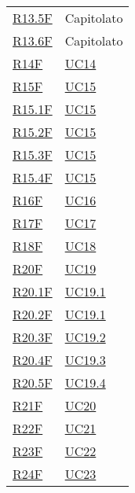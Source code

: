 \begin{center}
\begin{longtable}[!h]{p{50px} p{50px}}
        \hyperref[tab:RequisitiFunzionali]{R13.5F}   & Capitolato                    \\
        \hyperref[tab:RequisitiFunzionali]{R13.6F}   & Capitolato                    \\
        \hyperref[tab:RequisitiFunzionali]{R14F}     & \hyperref[sec:UC14]{UC14}     \\
        \hyperref[tab:RequisitiFunzionali]{R15F}     & \hyperref[sec:UC15]{UC15}     \\
        \hyperref[tab:RequisitiFunzionali]{R15.1F}   & \hyperref[sec:UC15]{UC15}     \\
        \hyperref[tab:RequisitiFunzionali]{R15.2F}   & \hyperref[sec:UC15]{UC15}     \\
        \hyperref[tab:RequisitiFunzionali]{R15.3F}   & \hyperref[sec:UC15]{UC15}     \\
        \hyperref[tab:RequisitiFunzionali]{R15.4F}   & \hyperref[sec:UC15]{UC15}     \\
        \hyperref[tab:RequisitiFunzionali]{R16F}     & \hyperref[sec:UC16]{UC16}     \\
        \hyperref[tab:RequisitiFunzionali]{R17F}     & \hyperref[sec:UC17]{UC17}     \\
        \hyperref[tab:RequisitiFunzionali]{R18F}     & \hyperref[sec:UC18]{UC18}     \\
        \hyperref[tab:RequisitiFunzionali]{R20F}     & \hyperref[sec:UC19]{UC19}     \\
        \hyperref[tab:RequisitiFunzionali]{R20.1F}   & \hyperref[sec:UC19.1]{UC19.1} \\
        \hyperref[tab:RequisitiFunzionali]{R20.2F}   & \hyperref[sec:UC19.1]{UC19.1} \\
        \hyperref[tab:RequisitiFunzionali]{R20.3F}   & \hyperref[sec:UC19.2]{UC19.2} \\
        \hyperref[tab:RequisitiFunzionali]{R20.4F}   & \hyperref[sec:UC19.3]{UC19.3} \\
        \hyperref[tab:RequisitiFunzionali]{R20.5F}   & \hyperref[sec:UC19.4]{UC19.4} \\
        \hyperref[tab:RequisitiFunzionali]{R21F}     & \hyperref[sec:UC20]{UC20}     \\
        \hyperref[tab:RequisitiFunzionali]{R22F}     & \hyperref[sec:UC21]{UC21}     \\
        \hyperref[tab:RequisitiFunzionali]{R23F}     & \hyperref[sec:UC22]{UC22}     \\
        \hyperref[tab:RequisitiFunzionali]{R24F}     & \hyperref[sec:UC23]{UC23}     \\

\end{longtable}
\end{center}
